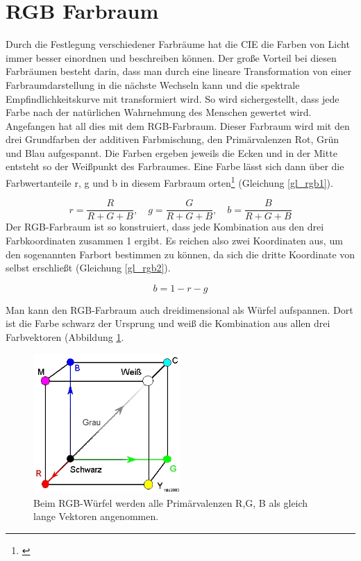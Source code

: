 \section{RGB Farbraum} \label{sec_rgb}
Durch die Festlegung verschiedener Farbräume hat die CIE die Farben von Licht immer besser einordnen und beschreiben können. Der große Vorteil bei diesen Farbräumen besteht darin, dass man durch eine lineare Transformation von einer Farbraumdarstellung in die nächste Wechseln kann und die spektrale Empfindlichkeitskurve mit transformiert wird. So wird sichergestellt, dass jede Farbe nach der natürlichen Wahrnehmung des Menschen gewertet wird.
Angefangen hat all dies mit dem RGB-Farbraum. Dieser Farbraum wird mit den drei Grundfarben der additiven Farbmischung, den Primärvalenzen Rot, Grün und Blau aufgespannt. Die Farben ergeben jeweils die Ecken und in der Mitte entsteht so der Weißpunkt des Farbraumes. Eine Farbe lässt sich dann über die Farbwertanteile r, g und b in diesem Farbraum orten\footnote{\cite[106]{hentschel}} (Gleichung \ref{gl_rgb1}).

\begin{equation}\label{gl_rgb1}
		r = \frac{R}{R+G+B},\quad g = \frac{G}{R+G+B},\quad b = \frac{B}{R+G+B}
\end{equation}
Der RGB-Farbraum ist so konstruiert, dass jede Kombination aus den drei Farbkoordinaten zusammen 1 ergibt. Es reichen also zwei Koordinaten aus, um den sogenannten Farbort bestimmen zu können, da sich die dritte Koordinate von selbst erschließt (Gleichung \ref{gl_rgb2}). 

\begin{equation}\label{gl_rgb2}
		b=1-r-g
\end{equation}

Man kann den RGB-Farbraum auch dreidimensional als Würfel aufspannen. Dort ist die Farbe schwarz der Ursprung und weiß die Kombination aus allen drei Farbvektoren (Abbildung \ref{b_rgb1}.

\begin{figure}[H]     %
\centering
\includegraphics[width=0.5\textwidth]{bilder/rgb1} 
\caption {Beim RGB-Würfel werden alle Primärvalenzen R,G, B als gleich lange Vektoren angenommen.\protect\footnotemark}\label{b_rgb1}
\end{figure}

